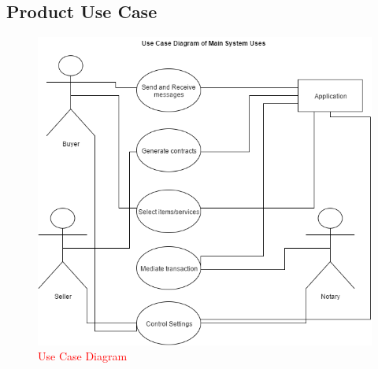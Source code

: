 \documentclass{article}
\begin{document}
\subsection{Product Use Case}
\begin{figure}[H]
	\includegraphics[scale=0.5]{usecase}
	\caption{\textcolor{red}{Use Case Diagram}}
\end{figure}


\end{document}
